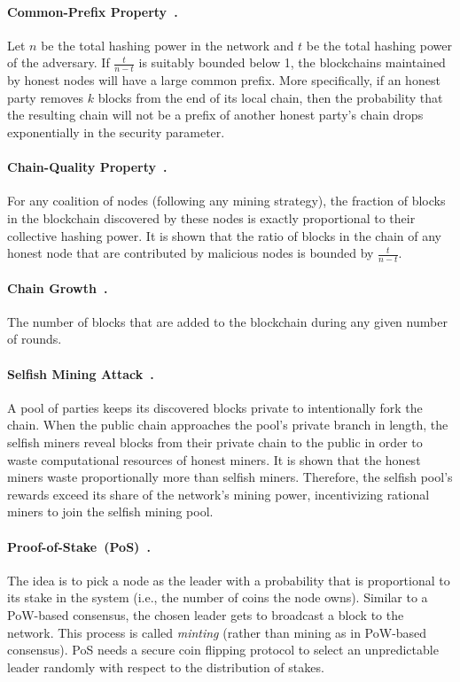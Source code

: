 \documentclass[11pt]{article}
\theoremstyle{mytheoremstyle}
\begin{document}
\paragraph{Common-Prefix Property~\cite{garay2015bitcoin}.} Let $n$ be the total hashing power in the network and $t$ be the total hashing power of the adversary. If $\frac{t}{n-t}$ is suitably bounded below 1, the blockchains maintained by honest nodes will have a large common prefix. More specifically, if an honest party removes $k$ blocks from the end of its local chain, then the probability that the resulting chain will not be a prefix of another honest party's chain drops exponentially in the security parameter. 

\paragraph{Chain-Quality Property~\cite{garay2015bitcoin}.} For any coalition of nodes (following any mining strategy), the fraction of blocks in the blockchain discovered by these nodes is exactly proportional to their collective hashing power. It is shown that the ratio of blocks in the chain of any honest node that are contributed by malicious nodes is bounded by $\frac{t}{n-t}$.

\paragraph{Chain Growth~\cite{cryptoeprint:2016:545}.} The number of blocks that are added to the blockchain during any given number of rounds.

\paragraph{Selfish Mining Attack~\cite{eyal2014}.} A pool of parties keeps its discovered blocks private to intentionally fork the chain. When the public chain approaches the pool's private branch in length, the selfish miners reveal blocks from their private chain to the public in order to waste computational resources of honest miners. It is shown that the honest miners waste proportionally more than selfish miners. Therefore, the selfish pool's rewards exceed its share of the network's mining power, incentivizing rational miners to join the selfish mining pool.

\paragraph{Proof-of-Stake~(PoS)~\cite{cryptoeprint:2016:889}.} The idea is to pick a node as the leader with a probability that is proportional to its stake in the system (i.e., the number of coins the node owns). Similar to a PoW-based consensus, the chosen leader gets to broadcast a block to the network. This process is called \emph{minting} (rather than mining as in PoW-based consensus). PoS needs a secure coin flipping protocol to select an unpredictable leader randomly with respect to the distribution of stakes.
\end{document}
